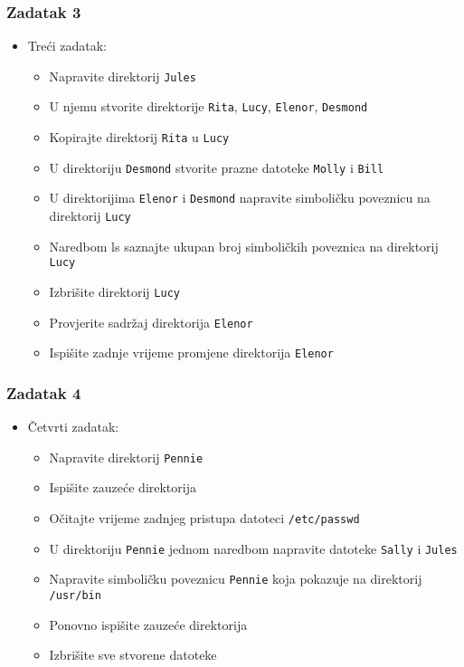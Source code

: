 \documentclass{beamer}
\newcommand{\shell}[1]{\texttt{#1}}
\begin{document}
\begin{frame}[t]
\frametitle{Zadatak 3}
\begin{itemize}
	\item Treći zadatak:
	\begin{itemize}
		\item Napravite direktorij \shell{Jules}
		\item U njemu stvorite direktorije \shell{Rita}, \shell{Lucy}, \shell{Elenor}, \shell{Desmond}
		\item Kopirajte direktorij \shell{Rita} u \shell{Lucy}
		\item U direktoriju \shell{Desmond} stvorite prazne datoteke \shell{Molly} i \shell{Bill}
		\item U direktorijima \shell{Elenor} i \shell{Desmond} napravite simboličku poveznicu na direktorij \shell{Lucy} 
		\item Naredbom ls saznajte ukupan broj simboličkih poveznica na direktorij \shell{Lucy}
		\item Izbrišite direktorij \shell{Lucy}
		\item Provjerite sadržaj direktorija \shell{Elenor}
		\item Ispišite zadnje vrijeme promjene direktorija \shell{Elenor}
	\end{itemize}
\end{itemize}
\end{frame}

\begin{frame}[t]
\frametitle{Zadatak 4}
\begin{itemize}
	\item Četvrti zadatak:
	\begin{itemize}
		\item Napravite direktorij \shell{Pennie}
		\item Ispišite zauzeće direktorija
		\item Očitajte vrijeme zadnjeg pristupa datoteci \shell{/etc/passwd}
		\item U direktoriju \shell{Pennie} jednom naredbom napravite datoteke \shell{Sally} i \shell{Jules}
		\item Napravite simboličku poveznicu \shell{Pennie} koja pokazuje na direktorij \shell{/usr/bin}
		\item Ponovno ispišite zauzeće direktorija
		\item Izbrišite sve stvorene datoteke
	\end{itemize}
\end{itemize}
\end{frame}
\end{document}
